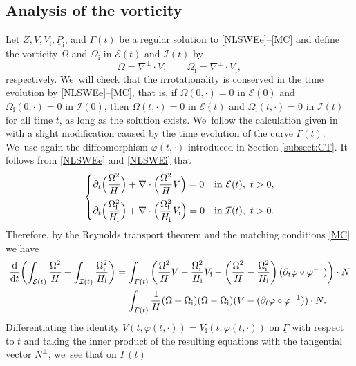 \documentclass[10pt]{amsart}
\newcommand{\dt}{\partial_t}
\newcommand{\cI}{{\mathcal I}}
\newcommand{\cE}{{\mathcal E}}
\newcommand{\ul}[1]{\underline{#1}}
\newcommand{\itGamma}{\mathit{\Gamma}}
\theoremstyle{definition}
\begin{document}
\subsection{Analysis of the vorticity}\label{sectvort}
Let $Z,V,V_\mathrm{i},\ul{P}_\mathrm{i}$, and $\itGamma(t)$ be a regular solution to \eqref{NLSWEe}--\eqref{MC} and define the vorticity $\Omega$
and $\Omega_\mathrm{i}$ in $\cE(t)$ and $\cI(t)$ by
\[
\Omega = \nabla^\perp\cdot V, \qquad \Omega_\mathrm{i} = \nabla^\perp\cdot V_\mathrm{i},
\]
respectively. We~will check that the irrotationality is conserved in the time evolution by \eqref{NLSWEe}--\eqref{MC}, that is,
if $\Omega(0,\cdot)=0$ in $\cE(0)$ and $\Omega_\mathrm{i}(0,\cdot)=0$ in $\cI(0)$,
then $\Omega(t,\cdot)=0$ in $\cE(t)$ and $\Omega_\mathrm{i}(t,\cdot)=0$ in $\cI(t)$ for all time $t$, as long as the solution exists. We~follow the calculation given in \cite[Section 2.4]{IguchiLannes2023} with a slight modification caused by the time evolution of the curve $\itGamma(t)$. We~use again the diffeomorphism $\varphi(t,\cdot)$ introduced in Section \ref{subsect:CT}.
It follows from \eqref{NLSWEe} and \eqref{NLSWEi} that
\[
\begin{cases}
\dt\Bigl(\dfrac{\Omega^2}{H}\Bigr) + \nabla\cdot\Bigl(\dfrac{\Omega^2}{H}V\Bigr)=0 &\text{in } \cE(t), \ t>0, \\[8pt]
\dt\Bigl(\dfrac{\Omega_\mathrm{i}^2}{H_\mathrm{i}}\Bigr)
+ \nabla\cdot\Bigl(\dfrac{\Omega_\mathrm{i}^2}{H_\mathrm{i}}V_\mathrm{i}\Bigr)=0 &\text{in } \cI(t), \ t>0.
\end{cases}
\]
Therefore, by the Reynolds transport theorem and the matching conditions \eqref{MC} we have
\begin{align}
\frac{\rm d}{{\rm d}t}\biggl(\int_{\cE(t)}\frac{\Omega^2}{H} + \int_{\cI(t)}\frac{\Omega_\mathrm{i}^2}{H_\mathrm{i}} \biggr)
&= \int_{\itGamma(t)} \left(\frac{\Omega^2}{H}V - \frac{\Omega_\mathrm{i}^2}{H_\mathrm{i}}V_\mathrm{i}
- \left(\frac{\Omega^2}{H} - \frac{\Omega_\mathrm{i}^2}{H_\mathrm{i}} \right)(\dt\varphi\circ\varphi^{-1}) \right)\cdot N \notag\\
\label{vorticity}
\\[-15pt]
&= \int_{\itGamma(t)} \frac{1}{H}(\Omega+\Omega_\mathrm{i})(\Omega-\Omega_\mathrm{i})(V-(\dt\varphi\circ\varphi^{-1}))\cdot N.\notag
\end{align}
Differentiating the identity $V(t,\varphi(t,\cdot))=V_\mathrm{i}(t,\varphi(t,\cdot))$ on $\ul{\itGamma}$ with respect to $t$ and taking the inner product of the
resulting equations with the tangential vector $N^\perp$, we~see that on $\itGamma(t)$
\end{document}
